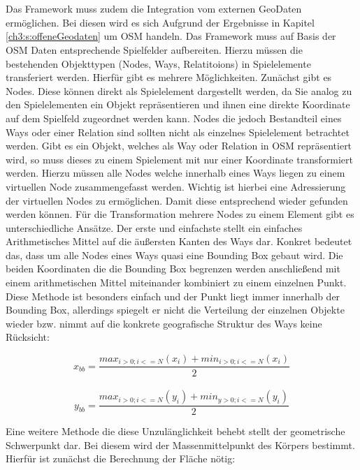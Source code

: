 \\\\
Das Framework muss zudem die Integration vom externen GeoDaten ermöglichen. Bei diesen wird es sich Aufgrund der Ergebnisse in Kapitel \ref{ch3:s:offeneGeodaten} um OSM handeln. Das Framework muss auf Basis der OSM Daten entsprechende Spielfelder aufbereiten. Hierzu müssen die bestehenden Objekttypen (Nodes, Ways, Relatitoions) in Spielelemente transferiert werden. Hierfür gibt es mehrere Möglichkeiten.
Zunächst gibt es Nodes. Diese können direkt als Spielelement dargestellt werden, da Sie analog zu den Spielelementen ein Objekt repräsentieren und ihnen eine direkte Koordinate auf dem Spielfeld zugeordnet werden kann. Nodes die jedoch Bestandteil eines Ways oder einer Relation sind sollten nicht als einzelnes Spielelement betrachtet werden.
Gibt es ein Objekt, welches als Way oder Relation in OSM repräsentiert wird, so muss dieses zu einem Spielement mit nur einer Koordinate transformiert werden. Hierzu müssen alle Nodes welche innerhalb eines Ways liegen zu einem \glqq virtuellen\grqq{} Node zusammengefasst werden.
Wichtig ist hierbei eine Adressierung der virtuellen Nodes zu ermöglichen. Damit diese entsprechend wieder gefunden werden können.
Für die Transformation mehrere Nodes zu einem Element gibt es unterschiedliche Ansätze. Der erste und einfachste stellt ein einfaches Arithmetisches Mittel auf die äußersten Kanten des Ways dar. Konkret bedeutet das, dass um alle Nodes eines Ways quasi eine Bounding Box gebaut wird. Die beiden Koordinaten die die Bounding Box begrenzen werden anschließend mit einem arithmetischen Mittel miteinander kombiniert zu einem einzelnen Punkt. Diese Methode ist besonders einfach und der Punkt liegt immer innerhalb der Bounding Box, allerdings spiegelt er nicht die Verteilung der einzelnen Objekte wieder bzw. nimmt auf die konkrete geografische Struktur des Ways keine Rücksicht:

\begin{equation}
x_{bb} = \frac{max_{i>0; i<=N}(x_i) + min_{i>0; i<=N}(x_i)}{2}
\end{equation}
\\
\begin{equation}
y_{bb} = \frac{max_{i>0; i<=N}(y_i) + min_{y>0; i<=N}(y_i)}{2}
\end{equation}

Eine weitere Methode die diese Unzulänglichkeit behebt stellt der geometrische Schwerpunkt dar.
Bei diesem wird der Massenmittelpunkt des Körpers bestimmt\cite{Papula.2006}. Hierfür ist zunächst die Berechnung der Fläche nötig:

